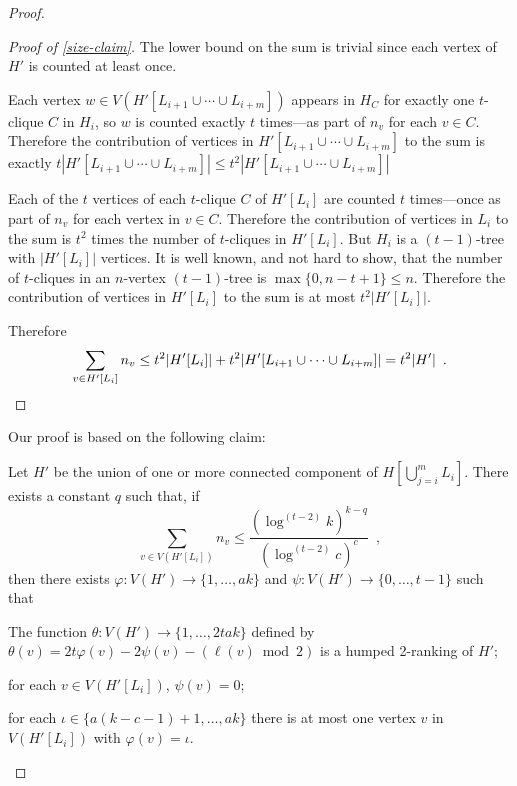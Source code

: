 \documentclass[kpfonts]{patmorin}
\theoremstyle{named}
\begin{document}
\begin{proof}
    \begin{proof}[Proof of \cref{size-claim}]
        The lower bound on the sum is trivial since each vertex of $H'$ is counted at least once.

        Each vertex $w\in V(H'[L_{i+1}\cup\cdots\cup L_{i+m}])$ appears in $H_C$ for exactly one $t$-clique $C$ in $H_i$, so $w$ is counted exactly $t$ times---as part of $n_v$ for each $v\in C$. Therefore the contribution of vertices in $H'[L_{i+1}\cup\cdots\cup L_{i+m}]$ to the sum is exactly $t|H'[L_{i+1}\cup\cdots\cup L_{i+m}]|\le t^2|H'[L_{i+1}\cup\cdots\cup L_{i+m}]|$

        Each of the $t$ vertices of each $t$-clique $C$ of $H'[L_i]$ are counted $t$ times---once as part of $n_v$ for each vertex in $v\in C$. Therefore the contribution of vertices in $L_i$ to the sum is $t^2$ times the number of $t$-cliques in $H'[L_i]$.  But $H_i$ is a $(t-1)$-tree with $|H'[L_i]|$ vertices.  It is well known, and not hard to show, that the number of $t$-cliques in an $n$-vertex $(t-1)$-tree is $\max\{0,n-t+1\}\le n$. Therefore the contribution of vertices in $H'[L_i]$ to the sum is at most $t^2|H'[L_i]|$.

        Therefore
        \[
            \sum_{v\in H'[L_i]} n_v \le t^2|H'[L_i]| + t^2|H'[L_{i+1}\cup\cdots\cup L_{i+m}]| = t^2|H'| \enspace . \qedhere
        \]
    \end{proof}

Our proof is based on the following claim:

    \begin{clm}\label{main-claim}
        Let $H'$ be the union of one or more connected component of $H[\bigcup_{j=i}^m L_i]$. There exists a constant $q$ such that,  if
        \begin{equation}
            \sum_{v\in V(H'[L_i])} n_v\le \frac{(\log^{(t-2)} k)^{k-q}}{(\log^{(t-2)} c)^c} \enspace , \label{main-size}
        \end{equation}
        then there exists $\varphi:V(H')\to\{1,\ldots,ak\}$ and $\psi:V(H')\to\{0,\ldots,t-1\}$ such that
        \begin{compactenum}[(P1)]
            \item The function $\theta:V(H')\to\{1,\ldots,2tak\}$ defined by $\theta(v)=2t\varphi(v) - 2\psi(v) -(\ell(v)\bmod 2)$ is a humped 2-ranking of $H'$;
            \item for each $v\in V(H'[L_i])$, $\psi(v)=0$;
            \item for each $\iota\in\{a(k-c-1)+1,\ldots,ak\}$ there is at most one vertex $v$ in $V(H'[L_i])$ with $\varphi(v)=\iota$.
        \end{compactenum}
    \end{clm}


\end{proof}
\end{document}
